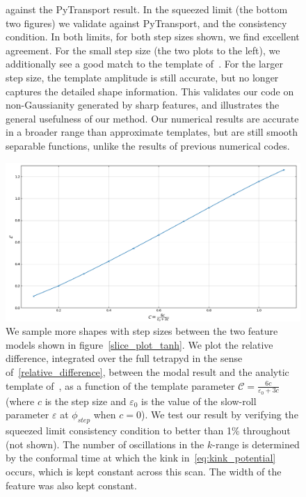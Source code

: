 \documentclass[a4paper,12pt]{extarticle}
\begin{document}
\begin{figure}
{	against the PyTransport result. In the squeezed limit (the bottom two figures)
	we validate against PyTransport, and the consistency condition.
	In both limits, for both step sizes shown, we find excellent agreement.
	For the small step size (the two plots to the left), we additionally
	see a good match to the template of~\cite{adshead}. For the larger step size,
	the template amplitude is still accurate,
    but no longer captures the detailed shape information.
    This validates our code on non-Gaussianity generated by sharp
    features, and illustrates the general usefulness of our method.
	Our numerical results are accurate in a broader range than
	approximate templates, but are still smooth separable functions,
	unlike the results of previous numerical codes.
}\label{fig:tanh_sqz}
\end{figure}
\begin{figure}[!pth]
\centering
\includegraphics[width=.75\columnwidth]{plots/tanh_scan_C_cropped.png}
\caption{
    We sample more shapes with step sizes between the two
    feature models shown in figure~\ref{slice_plot_tanh}.
    We plot the relative difference,
    integrated over the full tetrapyd
    in the sense of~\eqref{relative_difference},
    between the modal result and the analytic template of~\cite{adshead},
    as a function of the template parameter $\mathcal{C}=\frac{6c}{\varepsilon_0+3c}$
    (where $c$ is the step size and $\varepsilon_0$ is the value of the slow-roll parameter
    $\varepsilon$ at $\phi_{step}$ when $c=0$). We test our result by verifying
    the squeezed limit consistency
    condition to better than 1\% throughout (not shown). The number of oscillations in the
    $k$-range is determined by the conformal time at which the kink in~\eqref{eq:kink_potential}
    occurs, which is kept constant across this scan. The width of the feature was also kept constant.
}\label{fig:tanh_scan}
\end{figure}
\end{document}
